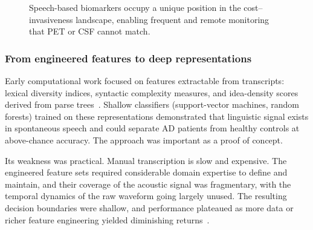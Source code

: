 \begin{figure}[H]
    \centering
    \caption[Biomarker modality comparison]{Speech-based biomarkers occupy a unique position in the cost--invasiveness landscape, enabling frequent and remote monitoring that PET or CSF cannot match.}
    \label{fig:biomarker_comparison}
\end{figure}

\subsubsection{From engineered features to deep representations}
\label{ssec:engineered_to_deep}

Early computational work focused on features extractable from transcripts: lexical diversity indices, syntactic complexity measures, and idea-density scores derived from parse trees~\cite{fraser2016linguistic}.
Shallow classifiers (support-vector machines, random forests) trained on these representations demonstrated that linguistic signal exists in spontaneous speech and could separate AD patients from healthy controls at above-chance accuracy.
The approach was important as a proof of concept.

Its weakness was practical.
Manual transcription is slow and expensive.
The engineered feature sets required considerable domain expertise to define and maintain, and their coverage of the acoustic signal was fragmentary, with the temporal dynamics of the raw waveform going largely unused.
The resulting decision boundaries were shallow, and performance plateaued as more data or richer feature engineering yielded diminishing returns~\cite{lima2025communicationsmedicine,fristed2022leveraging,gabirondo2025speechbiomarkers,slegers2021connectedppa}.


